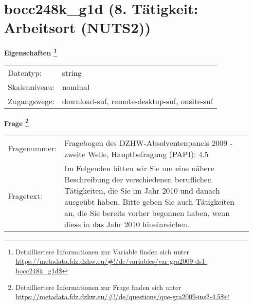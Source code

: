 
    \setcounter{footnote}{0}

    \vspace*{-1.8cm}
	\section{bocc248k\_g1d (8. Tätigkeit: Arbeitsort (NUTS2))}
	\label{section:bocc248k_g1d}



    \vspace*{0.5cm}
    \noindent\textbf{Eigenschaften
	\footnote{Detailliertere Informationen zur Variable finden sich unter
		\url{https://metadata.fdz.dzhw.eu/\#!/de/variables/var-gra2009-ds1-bocc248k_g1d$}}}\\
	\begin{tabularx}{\hsize}{@{}lX}
	Datentyp: & string \\
	Skalenniveau: & nominal \\
	Zugangswege: &
	  download-suf, 
	  remote-desktop-suf, 
	  onsite-suf
 \\
    \end{tabularx}



				\vspace*{0.5cm}
                \noindent\textbf{Frage
	                \footnote{Detailliertere Informationen zur Frage finden sich unter
		              \url{https://metadata.fdz.dzhw.eu/\#!/de/questions/que-gra2009-ins2-4.5$}}}\\
				\begin{tabularx}{\hsize}{@{}lX}
					Fragenummer: &
					  Fragebogen des DZHW-Absolventenpanels 2009 - zweite Welle, Hauptbefragung (PAPI):
					  4.5
 \\
					Fragetext: & Im Folgenden bitten wir Sie um eine nähere Beschreibung der verschiedenen beruflichen Tätigkeiten, die Sie im Jahr 2010 und danach ausgeübt haben. Bitte geben Sie auch Tätigkeiten an, die Sie bereits vorher begonnen haben, wenn diese in das Jahr 2010 hineinreichen. \\
				\end{tabularx}





